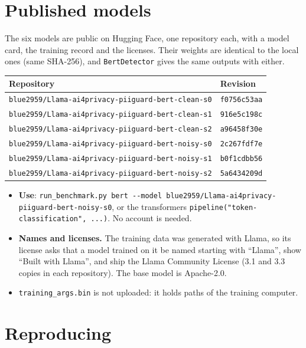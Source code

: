 \documentclass[10pt,a4paper]{article}
\newcommand{\file}[1]{\texttt{#1}}
\begin{document}
\section{Published models}

The six models are public on Hugging Face, one repository each, with a model card, the training
record and the licenses. Their weights are identical to the local ones (same SHA-256), and
\file{BertDetector} gives the same outputs with either.

\begin{center}
\begin{tabular}{@{}ll@{}}
\toprule
Repository & Revision \\
\midrule
\file{blue2959/Llama-ai4privacy-piiguard-bert-clean-s0} & \file{f0756c53aa} \\
\file{blue2959/Llama-ai4privacy-piiguard-bert-clean-s1} & \file{916e5c198c} \\
\file{blue2959/Llama-ai4privacy-piiguard-bert-clean-s2} & \file{a96458f30e} \\
\file{blue2959/Llama-ai4privacy-piiguard-bert-noisy-s0} & \file{2c267fdf7e} \\
\file{blue2959/Llama-ai4privacy-piiguard-bert-noisy-s1} & \file{b0f1cdbb56} \\
\file{blue2959/Llama-ai4privacy-piiguard-bert-noisy-s2} & \file{5a6434209d} \\
\bottomrule
\end{tabular}
\end{center}

\begin{itemize}
\item \textbf{Use}: \file{run\_benchmark.py bert -{}-model blue2959/Llama-ai4privacy-piiguard-bert-noisy-s0},
  or the transformers \file{pipeline("token-classification", ...)}. No account is needed.
\item \textbf{Names and licenses.} The training data was generated with Llama, so its license asks
  that a model trained on it be named starting with ``Llama'', show ``Built with Llama'', and ship
  the Llama Community License (3.1 and 3.3 copies in each repository). The base model is Apache-2.0.
\item \file{training\_args.bin} is not uploaded: it holds paths of the training computer.
\end{itemize}

\section{Reproducing}
\end{document}
